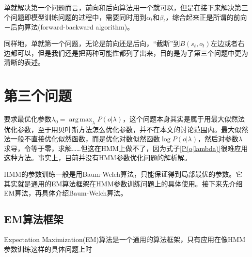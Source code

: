 \documentclass[11pt,a4paper]{article}
\DeclareMathOperator*{\argmax}{arg\,max}
\numberwithin{equation}{section}
\begin{document}
单就解决第一个问题而言，前向和后向算法用一个就可以，但是在接下来解决第三个问题即模型训练问题的过程中，需要同时用到$ \alpha_t $和$ \beta_t $，综合起来正是所谓的前向－后向算法(forward-backward algorithm)。

同样地，单就第一个问题，无论是前向还是后向，“截断”到$ B(s_t, o_t) $左边或者右边都可以，但是我们还是把两种可能性都列了出来，目的是为了第三个问题中更为清晰的表述。

\section{第三个问题}

要求最优化参数$ \lambda_0 = \argmax_{\lambda} P(o | \lambda) $，这个问题本身其实是属于用最大似然法优化参数，至于用贝叶斯方法怎么优化参数，并不在本文的讨论范围内。最大似然法一般不直接优化似然函数，而是优化对数似然函数$ \log P(o | \lambda) $，然后对参数$ \lambda $	求导，令等于零，求解……但这在HMM上做不了，因为式子\eqref{P(o|lambda)}很难应用这种方法。事实上，目前并没有HMM参数优化问题的解析解。

HMM的参数训练一般是用Baum-Welch算法，只能保证得到局部最优的参数。它其实就是通用的EM算法框架在HMM参数训练问题上的具体使用。接下来先介绍EM算法，再具体介绍Baum-Welch算法。

\subsection{EM算法框架}

Expectation Maximization(EM)算法是一个通用的算法框架，只有应用在像HMM参数训练这样的具体问题上时
\end{document}

